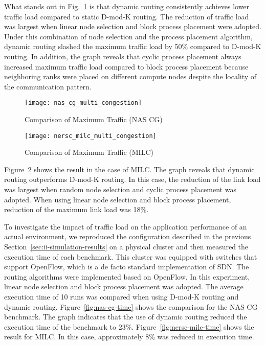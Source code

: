 What stands out in Fig.~\ref{fig:nas-cg-multi-congestion} is that
dynamic routing consistently achieves lower traffic load compared to
static \mbox{D-mod-K} routing. The reduction of traffic load was largest
when linear node selection and block process placement were adopted.
Under this combination of node selection and the process placement
algorithm, dynamic routing slashed the maximum traffic load by 50\%
compared to \mbox{D-mod-K} routing. In addition, the graph reveals that
cyclic process placement always increased maximum traffic load compared
to block process placement because neighboring ranks were placed on
different compute nodes despite the locality of the communication
pattern.

\begin{figure}
    \centering
    \texttt{[image: nas\_cg\_multi\_congestion]}
    \caption{Comparison of Maximum Traffic (NAS CG)}%
    \label{fig:nas-cg-multi-congestion}
\end{figure}

\begin{figure}
    \centering
    \texttt{[image: nersc\_milc\_multi\_congestion]}
    \caption{Comparison of Maximum Traffic (MILC)}%
    \label{fig:nersc-milc-multi-congestion}
\end{figure}

Figure~\ref{fig:nersc-milc-multi-congestion} shows the result in the
case of MILC\@. The graph reveals that dynamic routing outperforms
\mbox{D-mod-K} routing. In this case, the reduction of the link load was
largest when random node selection and cyclic process placement was
adopted. When using linear node selection and block process placement,
reduction of the maximum link load was 18\%.

To investigate the impact of traffic load on the application performance
of an actual environment, we reproduced the configuration described in
the previous Section~\ref{sec:ii-simulation-results} on a physical cluster and
then measured the execution time of each benchmark. This cluster was
equipped with switches that support OpenFlow, which is a de facto
standard implementation of SDN\@. The routing algorithms were implemented
based on OpenFlow. In this experiment, linear node selection and block
process placement was adopted. The average execution time of 10 runs was
compared when using \mbox{D-mod-K} routing and dynamic routing.
Figure~\ref{fig:nas-cg-time} shows the comparison for the NAS CG
benchmark. The graph indicates that the use of dynamic routing reduced
the execution time of the benchmark to 23\%.
Figure~\ref{fig:nersc-milc-time} shows the result for MILC\@. In this
case, approximately 8\% was reduced in execution time.

